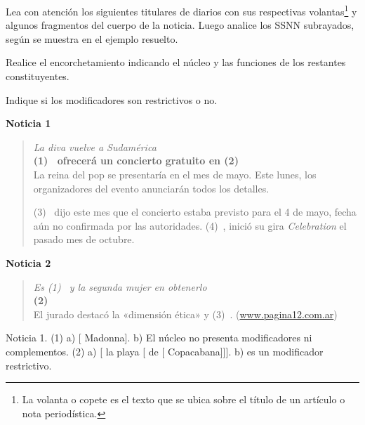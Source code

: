 \begin{ejercicio}\label{ej:05-titulares}
Lea con atención los siguientes titulares de diarios con sus respectivas
volantas\footnote{La volanta o copete es el texto que se ubica sobre el título
de un artículo o nota periodística.} y algunos fragmentos del cuerpo de la
noticia. Luego analice los SSNN subrayados, según se muestra en el ejemplo
resuelto.

\begin{consignas}
  \item Realice el encorchetamiento indicando el núcleo y las funciones de los
        restantes constituyentes.
  \item Indique si los modificadores son restrictivos o no.
\end{consignas}

\textbf{Noticia 1}

\begin{quote}\small
\textit{La diva vuelve a Sudamérica}\\
\textbf{(1)~ ofrecerá un concierto gratuito en
(2)~}\\
La reina del pop se presentaría en el mes de mayo. Este lunes, los organizadores
del evento anunciarán todos los detalles.

(3)~ dijo este mes que
el concierto estaba previsto para el 4 de mayo, fecha aún no confirmada por las
autoridades. (4)~, inició su gira
\textit{Celebration} el pasado mes de octubre.
\end{quote}

\textbf{Noticia 2}

\begin{quote}\small
\textit{Es (1)~ y la segunda
mujer en obtenerlo}\\
\textbf{(2)~}\\
El jurado destacó la «dimensión ética» y (3)~.
(\url{www.pagina12.com.ar})
\end{quote}

\begin{resuelto}
Noticia 1. (1) a) [ Madonna]. b) El núcleo no presenta
modificadores ni complementos. (2) a) [ la playa
[ de [ Copacabana]]]. b) 
es un modificador restrictivo.
\end{resuelto}
\end{ejercicio}

